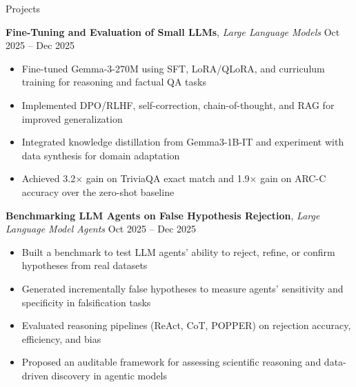 \documentclass[hidelinks]{resume} %
\begin{document}
\vspace{-5pt}
\begin{rSection}{P\MakeLowercase{rojects}}
\vspace{-2pt}

\textbf{Fine-Tuning and Evaluation of Small LLMs}, \textit{Large Language Models}
\hfill Oct 2025 -- Dec 2025
\vspace{-5pt}
\begin{itemize}
\itemsep -7pt {} 
\item Fine-tuned Gemma-3-270M using SFT, LoRA/QLoRA, and curriculum training for reasoning and factual QA tasks
\item Implemented DPO/RLHF, self-correction, chain-of-thought, and RAG for improved generalization
\item Integrated knowledge distillation from Gemma3-1B-IT and experiment with data synthesis for domain adaptation
\item Achieved 3.2× gain on TriviaQA exact match and 1.9× gain on ARC-C accuracy over the zero-shot baseline
\end{itemize}

\textbf{Benchmarking LLM Agents on False Hypothesis Rejection}, \textit{Large Language Model Agents}
\hfill Oct 2025 -- Dec 2025
\vspace{-5pt}
\begin{itemize}
\itemsep -7pt {} 
\item Built a benchmark to test LLM agents’ ability to reject, refine, or confirm hypotheses from real datasets
\item Generated incrementally false hypotheses to measure agents’ sensitivity and specificity in falsification tasks
\item Evaluated reasoning pipelines (ReAct, CoT, POPPER) on rejection accuracy, efficiency, and bias
\item Proposed an auditable framework for assessing scientific reasoning and data-driven discovery in agentic models
\end{itemize}


\end{rSection}
\end{document}

